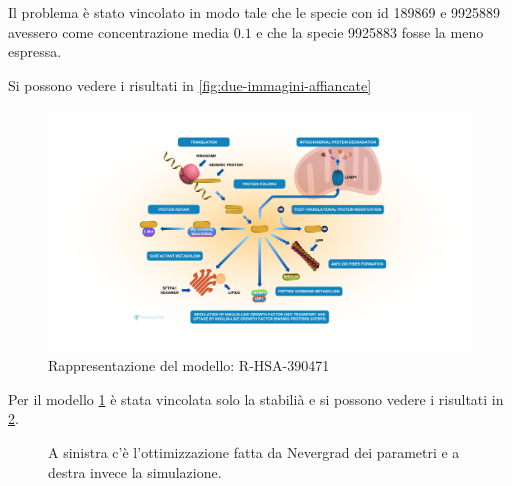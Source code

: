 Il problema è stato vincolato in modo tale che le specie con id 189869 e 9925889 avessero come concentrazione media $0.1$ e che la specie 9925883 fosse la meno espressa.

Si possono vedere i risultati in \ref{fig:due-immagini-affiancate}

\begin{figure}[htbp]
    \centering
    \includegraphics[width=\textwidth]{R-HSA-390471.png}
    \caption{Rappresentazione del modello: R-HSA-390471}
    \label{fig:R-HSA-390471}
\end{figure}

Per il modello \ref{fig:R-HSA-390471} è stata vincolata solo la stabilià e si possono vedere i risultati in \ref{fig:due-immagini-affiancate2}.

\begin{figure}[htbp]
    \centering
    \caption{A sinistra c'è l'ottimizzazione fatta da Nevergrad dei parametri e a destra invece la simulazione.}
    \label{fig:due-immagini-affiancate2}
\end{figure}